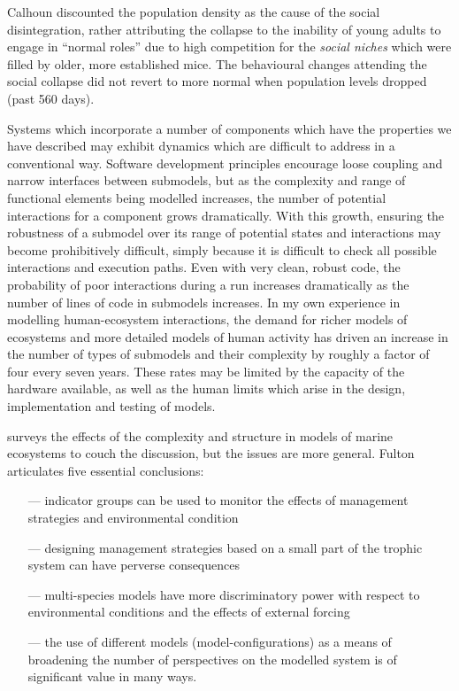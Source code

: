 Calhoun discounted the population density as the cause of the social
disintegration, rather attributing the collapse to the inability of
young adults to engage in ``normal roles'' due to high competition for
the \emph{social niches} which were filled by older, more established
mice. The behavioural changes attending the social collapse did not revert
to more normal when population levels dropped (past 560 days).

Systems which incorporate a number of components which have the
properties we have described may exhibit dynamics which are difficult
to address in a conventional way. Software development principles
encourage loose coupling and narrow interfaces between submodels, but
as the complexity and range of functional elements being modelled
increases, the number of potential interactions for a component grows
dramatically.  With this growth, ensuring the robustness of a submodel
over its range of potential states and interactions may become
prohibitively difficult, simply because it is difficult to check all
possible interactions and execution paths.  Even with very clean,
robust code, the probability of poor interactions during a run
increases dramatically as the number of lines of code in submodels
increases. In my own experience in modelling human-ecosystem
interactions, the demand for richer models of ecosystems and more
detailed models of human activity has driven an increase in the number
of types of submodels and their complexity by roughly a factor of four
every seven years. These rates may be limited by the
capacity of the hardware available, as well as the human limits which
arise in the design, implementation and testing of models.

\Cite{fultonPhD} surveys the effects of the
complexity and structure in models of marine ecosystems to couch the
discussion, but the issues are more general.  Fulton articulates five
essential conclusions:
\begin{itemize}
\item[---] indicator groups can be used to monitor the effects of
management strategies and environmental condition
\item[---] designing management strategies based on a small part of
the trophic system can have perverse consequences
\item[---] multi-species models have more discriminatory power with
respect to environmental conditions and the effects of external
forcing

\item[---] the use of different models (model-configurations) as a
means of broadening the number of perspectives on the modelled system
is of significant value in many ways.
\end{itemize}


